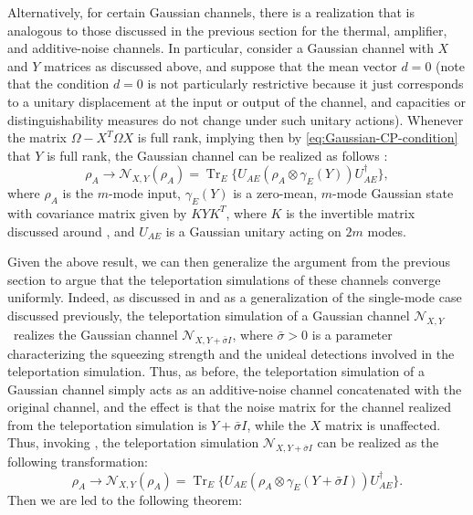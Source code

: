 \documentclass[apsrev,twocolumn]{revtex4-1}%
\begin{document}
Alternatively, for certain Gaussian channels, there is a realization that is
analogous to those discussed in the previous section for the thermal,
amplifier, and additive-noise channels. In particular, consider a Gaussian
channel with $X$ and $Y$ matrices as discussed above, and suppose that the
mean vector $d=0$ (note that the condition $d=0$ is not particularly
restrictive because it just corresponds to a unitary displacement at the input
or output of the channel, and capacities or distinguishability measures do not
change under such unitary actions). Whenever the matrix $\Omega-X^{T}\Omega X$
is full rank, implying then by \eqref{eq:Gaussian-CP-condition} that $Y$ is
full rank, the Gaussian channel can be realized as follows \cite[Theorem~1]%
{CEGH08}:%
\begin{equation}
\rho_{A}\rightarrow\mathcal{N}_{X,Y}(\rho_{A})=\operatorname{Tr}_{E}%
\{U_{AE}(\rho_{A}\otimes\gamma_{E}(Y))U_{AE}^{\dag}\}, \label{eq:multi-mode-env}
\end{equation}
where $\rho_{A}$ is the $m$-mode input, $\gamma_{E}(Y)$ is a zero-mean, $m$-mode
Gaussian state with covariance matrix given by $KYK^{T}$, where $K$ is the
invertible matrix discussed around \cite[Eqs.~(27)--(28)]{CEGH08}, and
$U_{AE}$ is a Gaussian unitary acting on $2m$ modes.

Given the above result, we can then generalize the argument from the previous
section to argue that the teleportation simulations of these channels converge
uniformly. Indeed, as discussed in \cite{WPG07} and as a generalization of the
single-mode case discussed previously, the teleportation simulation of a
Gaussian channel $\mathcal{N}_{X,Y}$\ realizes the Gaussian channel
$\mathcal{N}_{X,Y+\bar{\sigma}I}$, where $\bar{\sigma}>0$ is a parameter
characterizing the squeezing strength and the unideal detections involved in
the teleportation simulation. Thus, as before, the teleportation simulation of
a Gaussian channel simply acts as an additive-noise channel concatenated with
the original channel, and the effect is that the noise matrix for the channel
realized from the teleportation simulation is $Y+\bar{\sigma}I$, while the $X$ matrix is unaffected. Thus,
invoking \cite[Theorem~1]{CEGH08}, the teleportation simulation $\mathcal{N}%
_{X,Y+\bar{\sigma}I}$ can be realized as the following transformation:%
\begin{equation}
\rho_{A}\rightarrow\mathcal{N}_{X,Y}(\rho_{A})=\operatorname{Tr}_{E}%
\{U_{AE}(\rho_{A}\otimes\gamma_{E}(Y+\bar{\sigma}I))U_{AE}^{\dag}\}.
\end{equation}
Then we are led to the following theorem:
\end{document}
